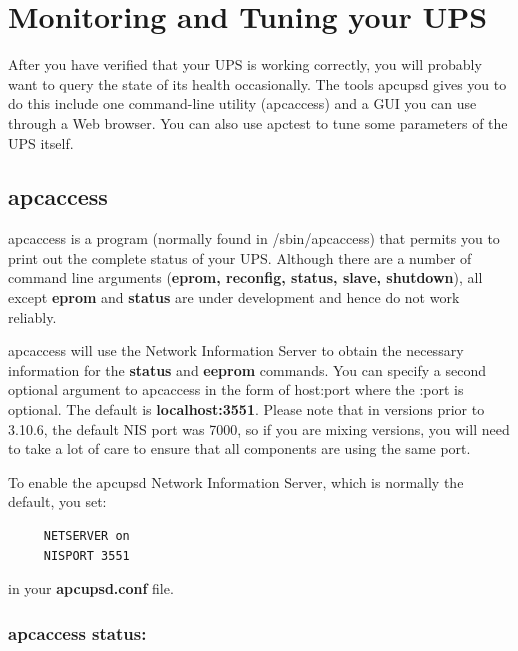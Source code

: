 {{\section*{Monitoring and Tuning your UPS}

\label{index-Monitoring-109}
\label{index-Tuning-110}
After you have verified that your UPS is working correctly, you will probably
want to query the state of its health occasionally. The tools apcupsd gives
you to do this include one command-line utility (apcaccess) and a GUI you can
use through a Web browser.  You can also use apctest to tune some parameters
of the UPS itself. 

\label{apcaccess}

\subsection*{apcaccess}

\label{index-apcaccess-111}
apcaccess is a program (normally found in /sbin/apcaccess) that permits you to
print out the complete status of your UPS. Although there are a number of
command line arguments ({\bf eprom, reconfig, status, slave, shutdown}), all
except {\bf eprom} and {\bf status} are under development and hence do not
work reliably.  

apcaccess will use the Network Information Server to obtain the necessary
information for the {\bf status} and {\bf eeprom} commands. You can specify
a second optional argument to apcaccess in the form of host:port where the
:port is optional. The default is {\bf localhost:3551}. Please note
that in versions prior to 3.10.6, the default NIS port was 7000, so if you are
mixing versions, you will need to take a lot of care to ensure that all
components are using the same port.  

To enable the apcupsd Network Information Server, which is normally the
default, you set: 

\footnotesize
\begin{verbatim}
     NETSERVER on
     NISPORT 3551
\end{verbatim}
\normalsize

in your {\bf apcupsd.conf} file. 

\label{apcaccess-status}

\subsubsection*{apcaccess status:}

}}
